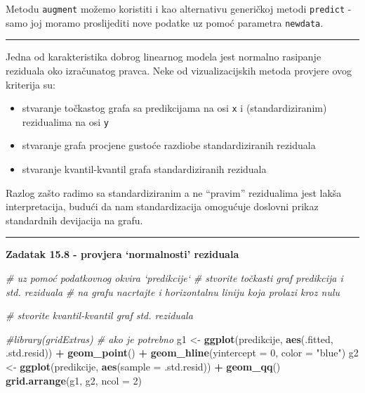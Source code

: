 \documentclass[]{book}
\newenvironment{Shaded}{\begin{snugshade}}{\end{snugshade}}
\newcommand{\KeywordTok}[1]{\textcolor[rgb]{0.13,0.29,0.53}{\textbf{#1}}}
\newcommand{\DataTypeTok}[1]{\textcolor[rgb]{0.13,0.29,0.53}{#1}}
\newcommand{\DecValTok}[1]{\textcolor[rgb]{0.00,0.00,0.81}{#1}}
\newcommand{\StringTok}[1]{\textcolor[rgb]{0.31,0.60,0.02}{#1}}
\newcommand{\CommentTok}[1]{\textcolor[rgb]{0.56,0.35,0.01}{\textit{#1}}}
\newcommand{\OperatorTok}[1]{\textcolor[rgb]{0.81,0.36,0.00}{\textbf{#1}}}
\newcommand{\NormalTok}[1]{#1}
\providecommand{\tightlist}{%
  \setlength{\itemsep}{0pt}\setlength{\parskip}{0pt}}
\theoremstyle{definition}
\theoremstyle{definition}
\theoremstyle{definition}
\theoremstyle{remark}
\begin{document}
Metodu \texttt{augment} možemo koristiti i kao alternativu generičkoj
metodi \texttt{predict} - samo joj moramo proslijediti nove podatke uz
pomoć parametra \texttt{newdata}.

\begin{center}\rule{0.5\linewidth}{\linethickness}\end{center}

Jedna od karakteristika dobrog linearnog modela jest normalno rasipanje
reziduala oko izračunatog pravca. Neke od vizualizacijskih metoda
provjere ovog kriterija su:

\begin{itemize}
\tightlist
\item
  stvaranje točkastog grafa sa predikcijama na osi \texttt{x} i
  (standardiziranim) rezidualima na osi \texttt{y}
\item
  stvaranje grafa procjene gustoće razdiobe standardiziranih reziduala
\item
  stvaranje kvantil-kvantil grafa standardiziranih reziduala
\end{itemize}

Razlog zašto radimo sa standardiziranim a ne ``pravim'' rezidualima jest
lakša interpretacija, budući da nam standardizacija omogućuje doslovni
prikaz standardnih devijacija na grafu.

\begin{center}\rule{0.5\linewidth}{\linethickness}\end{center}

\textbf{Zadatak 15.8 - provjera `normalnosti' reziduala}

\begin{Shaded}
\begin{Highlighting}[]
\CommentTok{# uz pomoć podatkovnog okvira `predikcije`}
\CommentTok{# stvorite točkasti graf predikcija i std. reziduala}
\CommentTok{# na grafu nacrtajte i horizontalnu liniju koja prolazi kroz nulu}

\CommentTok{# stvorite kvantil-kvantil graf std. reziduala}
\end{Highlighting}
\end{Shaded}

\begin{Shaded}
\begin{Highlighting}[]
\CommentTok{#library(gridExtras)  # ako je potrebno}
\NormalTok{g1 <-}\StringTok{ }\KeywordTok{ggplot}\NormalTok{(predikcije, }\KeywordTok{aes}\NormalTok{(.fitted, .std.resid)) }\OperatorTok{+}\StringTok{ }\KeywordTok{geom_point}\NormalTok{() }\OperatorTok{+}
\StringTok{  }\KeywordTok{geom_hline}\NormalTok{(}\DataTypeTok{yintercept =} \DecValTok{0}\NormalTok{, }\DataTypeTok{color =} \StringTok{"blue"}\NormalTok{)}
\NormalTok{g2 <-}\StringTok{ }\KeywordTok{ggplot}\NormalTok{(predikcije, }\KeywordTok{aes}\NormalTok{(}\DataTypeTok{sample =}\NormalTok{ .std.resid)) }\OperatorTok{+}\StringTok{ }\KeywordTok{geom_qq}\NormalTok{()}
\KeywordTok{grid.arrange}\NormalTok{(g1, g2, }\DataTypeTok{ncol =} \DecValTok{2}\NormalTok{)}
\end{Highlighting}
\end{Shaded}
\end{document}
